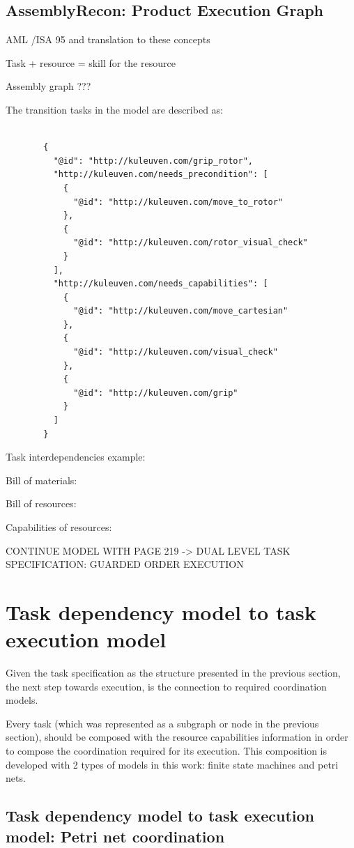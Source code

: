 \documentclass[a4paper,10pt]{article}
\begin{document}
\subsection{AssemblyRecon: Product Execution Graph}

AML /ISA 95 and translation to these concepts

Task + resource = skill for the resource

Assembly graph ???

The transition tasks in the model are described as:

\begin{figure}
\begin{lstlisting}

  {
    "@id": "http://kuleuven.com/grip_rotor",
    "http://kuleuven.com/needs_precondition": [
      {
        "@id": "http://kuleuven.com/move_to_rotor"
      },
      {
        "@id": "http://kuleuven.com/rotor_visual_check"
      }
    ],
    "http://kuleuven.com/needs_capabilities": [
      {
        "@id": "http://kuleuven.com/move_cartesian"
      },
      {
        "@id": "http://kuleuven.com/visual_check"
      },
      {
        "@id": "http://kuleuven.com/grip"
      }
    ]
  }
\end{lstlisting}
\end{figure}

Task interdependencies example:

Bill of materials:


Bill of resources:

Capabilities of resources: 

CONTINUE MODEL WITH PAGE 219 -> DUAL LEVEL TASK SPECIFICATION: GUARDED ORDER EXECUTION 


\section{Task dependency model to task execution model}

Given the task specification as the structure presented in the previous section, the next step towards execution, is the connection to required coordination models.

Every task (which was represented as a subgraph or node in the previous section), should be composed with the resource capabilities information in order to compose the coordination required for its execution. This composition is developed with 2 types of models in this work: finite state machines and petri nets.

\subsection{Task dependency model to task execution model: Petri net coordination}
\end{document}
